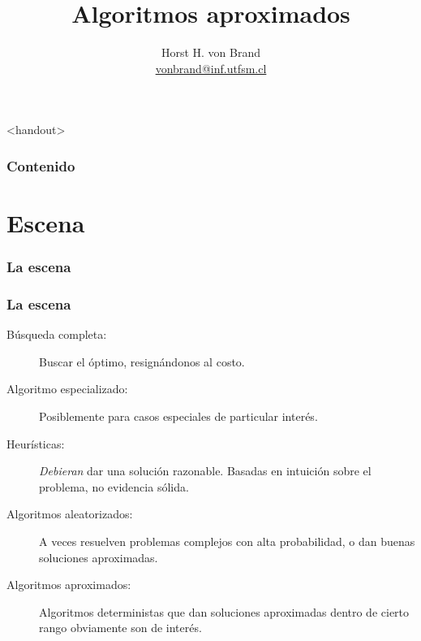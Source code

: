 \documentclass[english, spanish, fleqn,%
hyperref = {colorlinks, urlcolor = blue}%
]{beamer}
\title{Algoritmos aproximados}
\author[Horst H. von Brand]{Horst H. von Brand\\
  \href{mailto:vonbrand@inf.utfsm.cl}{vonbrand@inf.utfsm.cl}}
\institute[DI UTFSM]{Departamento de Informática\\
                     Universidad Técnica Federico Santa María}
\date{}
\begin{document}
\frame{\maketitle}

\begin{frame}<handout>
  \frametitle{Contenido}

  \tableofcontents
\end{frame}

\section{Escena}

\begin{frame}
  \setcounter{beamerpauses}{2}
  \frametitle{La escena}

\end{frame}

\begin{frame}
  \setcounter{beamerpauses}{2}
  \frametitle{La escena}

  \begin{description}
  \item[Búsqueda completa:]
    Buscar el óptimo,
    resignándonos al costo.
  \item[Algoritmo especializado:]
    Posiblemente para casos especiales de particular interés.
  \item[Heurísticas:]
    \emph{Debieran} dar una solución razonable.
    Basadas en intuición sobre el problema,
    no evidencia sólida.
  \item[Algoritmos aleatorizados:]
    A veces resuelven problemas complejos con alta probabilidad,
    o dan buenas soluciones aproximadas.
  \item[Algoritmos aproximados:]
    Algoritmos deterministas que dan soluciones aproximadas
    dentro de cierto rango obviamente son de interés.
  \end{description}
\end{frame}
\end{document}
